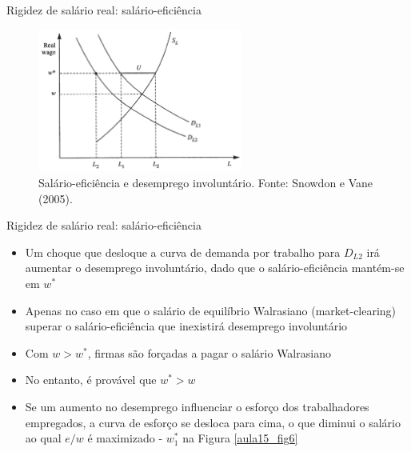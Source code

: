 \documentclass[10pt]{beamer}
\begin{document}
\begin{frame}{Rigidez de salário real: salário-eficiência}
    \begin{figure}
        \centering
        \includegraphics[width=0.6\textwidth]{./figures/aula15_fig7.PNG}
        \caption{Salário-eficiência e desemprego involuntário. Fonte: Snowdon e Vane (2005).}
        \label{aula15_fig7}
    \end{figure}
\end{frame}

\begin{frame}{Rigidez de salário real: salário-eficiência}
    \begin{itemize}
        \item Um choque que desloque a curva de demanda por trabalho para $D_{L2}$ irá aumentar o desemprego involuntário, dado que o salário-eficiência mantém-se em $w^*$\bigskip
        \item Apenas no caso em que o salário de equilíbrio Walrasiano (market-clearing) superar o salário-eficiência que inexistirá desemprego involuntário\bigskip
        \item Com $w > w^*$, firmas são forçadas a pagar o salário Walrasiano\bigskip
        \item No entanto, é provável que $w^* > w$\bigskip
        \item Se um aumento no desemprego influenciar o esforço dos trabalhadores empregados, a curva de esforço se desloca para cima, o que diminui o salário ao qual $e/w$ é maximizado - $w_1^*$ na Figura \ref{aula15_fig6}
    \end{itemize}
\end{frame}
\end{document}
